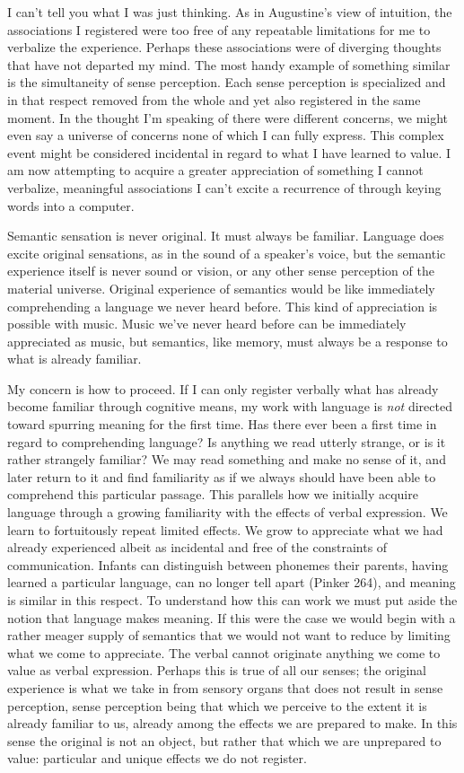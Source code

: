 \documentclass[
]{memoir}
\begin{document}
I can't tell you what I was just thinking. As in Augustine's view of
intuition, the associations I registered were too free of any repeatable
limitations for me to verbalize the experience. Perhaps these
associations were of diverging thoughts that have not departed my mind.
The most handy example of something similar is the simultaneity of sense
perception. Each sense perception is specialized and in that respect
removed from the whole and yet also registered in the same moment. In
the thought I'm speaking of there were different concerns, we might even
say a universe of concerns none of which I can fully express. This
complex event might be considered incidental in regard to what I have
learned to value. I am now attempting to acquire a greater appreciation
of something I cannot verbalize, meaningful associations I can't excite
a recurrence of through keying words into a computer.

Semantic sensation is never original. It must always be familiar.
Language does excite original sensations, as in the sound of a speaker's
voice, but the semantic experience itself is never sound or vision, or
any other sense perception of the material universe. Original experience
of semantics would be like immediately comprehending a language we never
heard before. This kind of appreciation is possible with music. Music
we've never heard before can be immediately appreciated as music, but
semantics, like memory, must always be a response to what is already
familiar.

My concern is how to proceed. If I can only register verbally what has
already become familiar through cognitive means, my work with language
is \emph{not} directed toward spurring meaning for the first time. Has
there ever been a first time in regard to comprehending language? Is
anything we read utterly strange, or is it rather strangely familiar? We
may read something and make no sense of it, and later return to it and
find familiarity as if we always should have been able to comprehend
this particular passage. This parallels how we initially acquire
language through a growing familiarity with the effects of verbal
expression. We learn to fortuitously repeat limited effects. We grow to
appreciate what we had already experienced albeit as incidental and free
of the constraints of communication. Infants can distinguish between
phonemes their parents, having learned a particular language, can no
longer tell apart (Pinker 264), and meaning is similar in this respect.
To understand how this can work we must put aside the notion that
language makes meaning. If this were the case we would begin with a
rather meager supply of semantics that we would not want to reduce by
limiting what we come to appreciate. The verbal cannot originate
anything we come to value as verbal expression. Perhaps this is true of
all our senses; the original experience is what we take in from sensory
organs that does not result in sense perception, sense perception being
that which we perceive to the extent it is already familiar to us,
already among the effects we are prepared to make. In this sense the
original is not an object, but rather that which we are unprepared to
value: particular and unique effects we do not register.
\end{document}
